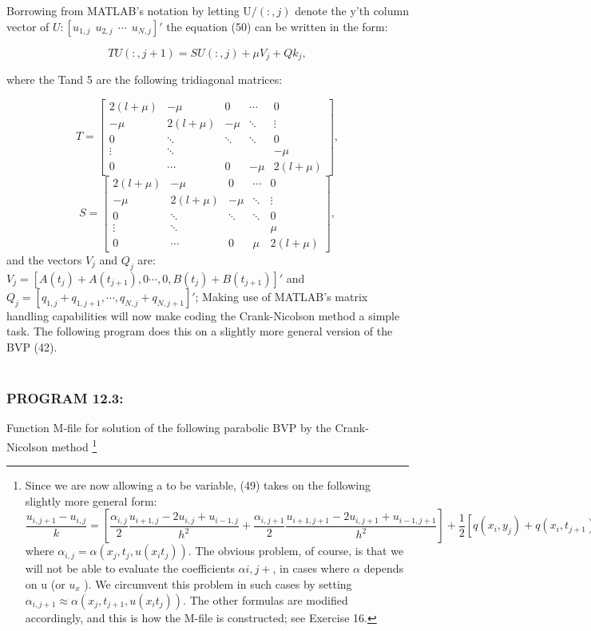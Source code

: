 \documentclass[../main.tex]{subfiles}
\begin{document}
Borrowing from MATLAB's notation by letting U$/(:, j)$ denote the y'th column vector of $U: [u_{1,j}~~u_{2,j}~~\cdots~~u_{N,j}]'$ the equation (50) can be written in the form: 

\begin{equation}
TU(:,j+1)= SU(:,j)+\mu V_j +Qk_j,
\end{equation}

where the Tand 5 are the following tridiagonal matrices:

$$ T= 
\left[\begin{array}{ccccc}
2(l+\mu) & -\mu & 0 & \cdots & 0\\
-\mu & 2(l+\mu) & -\mu & \ddots & \vdots\\
0 & \ddots & \ddots & \ddots & 0\\
\vdots & \ddots &  &  & -\mu\\
0 & \cdots & 0 & -\mu & 2(l+\mu) 
\end{array}\right],$$
$$ S= 
\left[\begin{array}{ccccc}
2(l+\mu) & -\mu & 0 & \cdots & 0\\
-\mu & 2(l+\mu) & -\mu & \ddots & \vdots\\
0 & \ddots & \ddots & \ddots & 0\\
\vdots & \ddots &  &  & \mu\\
0 & \cdots & 0 & \mu & 2(l+\mu) 
\end{array}\right],$$
and the vectors $V_j$ and $Q_j$ are: $V_j = [A(t_j)+A(t_{j+1}),0 \cdots,0,B(t_j)+B(t_{j+1})]'$ and $Q_j =[q_{1,j}+q_{1,j+1},\cdots,q_{N,j}+q_{N,j+1}]'$; Making use of MATLAB's matrix handling capabilities will now make coding the Crank-Nicolson method a simple task. The following program does this on a slightly more general version of the BVP (42). 
\\
\\
\subsubsection{PROGRAM 12.3:}
Function M-file for solution of the following parabolic BVP by the 
Crank-Nicolson method
\footnote{ Since we are now allowing a to be variable, (49) takes on the following slightly more general form:
$\dfrac{u_{i,j+1}-u_{i,j}}{k}=
[\dfrac{\alpha_{i,j}}{2}
\dfrac{u_{i+1,j}-2u_{i,j}+u_{i-1,j}}{h^2}+
\dfrac{\alpha_{i,j+1}}{2}
\dfrac{u_{i+1,j+1}-2u_{i,j+1}+u_{i-1,j+1}}{h^2}]
+\dfrac{1}{2}[q(x_i,y_j)+q(x_i,t_{j+1})],$
where $\alpha_{i,j} = \alpha(x_j,t_j,u(x_i t_j))$. The obvious problem, of course, is that we will not be able to evaluate the coefficients $\alpha{i,j+}$, in cases where $\alpha$ depends on u (or $u_x$ ). We circumvent this problem in such cases by setting $\alpha_{i,j+1} \approx \alpha(x_j,t_{j+1},u(x_i t_j))$. The other formulas are modified accordingly, and this is how the M-file is constructed; see Exercise 16. }
\end{document}
